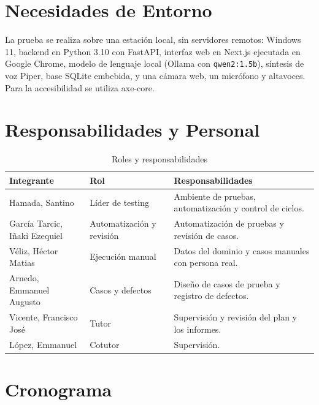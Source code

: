 \documentclass[12pt, a4paper]{article}
\begin{document}
\section{Necesidades de Entorno}

La prueba se realiza sobre una estación local, sin servidores remotos:
Windows 11, backend en Python 3.10 con FastAPI, interfaz web en Next.js
ejecutada en Google Chrome, modelo de lenguaje local (Ollama con
\texttt{qwen2:1.5b}), síntesis de voz Piper, base SQLite embebida, y una
cámara web, un micrófono y altavoces. Para la accesibilidad se utiliza
axe-core.

\section{Responsabilidades y Personal}

\begin{table}[H]
    \centering
    \caption{Roles y responsabilidades}
    \small
    \begin{tabularx}{\textwidth}{>{\raggedright\arraybackslash}p{4.6cm} >{\raggedright\arraybackslash}p{3.8cm} X}
        \toprule
        \textbf{Integrante} & \textbf{Rol} & \textbf{Responsabilidades} \\
        \midrule
        Hamada, Santino & Líder de testing & Ambiente de pruebas, automatización y control de ciclos. \\
        García Tarcic, Iñaki Ezequiel & Automatización y revisión & Automatización de pruebas y revisión de casos. \\
        Véliz, Héctor Matias & Ejecución manual & Datos del dominio y casos manuales con persona real. \\
        Arnedo, Emmanuel Augusto & Casos y defectos & Diseño de casos de prueba y registro de defectos. \\
        Vicente, Francisco José & Tutor & Supervisión y revisión del plan y los informes. \\
        López, Emmanuel & Cotutor & Supervisión. \\
        \bottomrule
    \end{tabularx}
\end{table}

\section{Cronograma}
\end{document}
